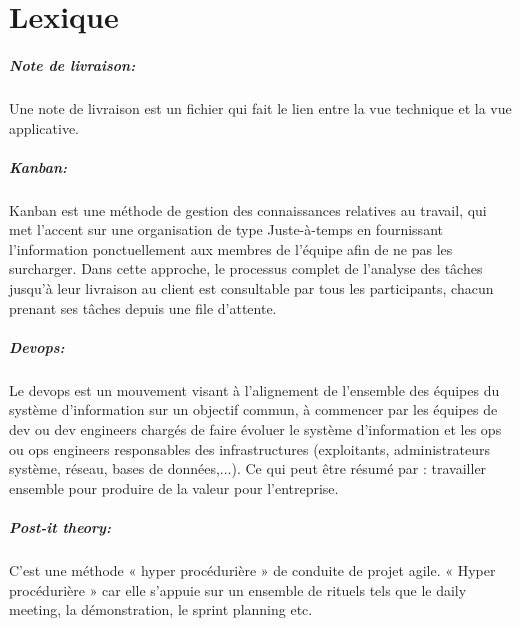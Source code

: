 \chapter*{Lexique}
\label{chap:Lexique}

\paragraph{Note de livraison: }
\label{lexi:delivery_note}
Une note de livraison est un fichier qui fait le lien entre la vue technique et la vue applicative.

\paragraph{Kanban: }
\label{lexi:kanban}
Kanban est une méthode de gestion des connaissances relatives au travail, qui met l’accent sur une organisation de type Juste-à-temps en fournissant l'information ponctuellement aux membres de l'équipe afin de ne pas les surcharger. Dans cette approche, le processus complet de l'analyse des tâches jusqu’à leur livraison au client est consultable par tous les participants, chacun prenant ses tâches depuis une file d'attente.

\paragraph{Devops: }
\label{lexi:devops}
Le devops est un mouvement visant à l'alignement de l'ensemble des équipes du système d'information sur un objectif commun, à commencer par les équipes de dev ou dev engineers chargés de faire évoluer le système d'information et les ops ou ops engineers responsables des infrastructures (exploitants, administrateurs système, réseau, bases de données,...). Ce qui peut être résumé par : travailler ensemble pour produire de la valeur pour l'entreprise.

\paragraph{Post-it theory: }
\label{lexi:post_it_theory}
C’est une méthode « hyper procédurière » de conduite de projet agile.
« Hyper procédurière » car elle s’appuie sur un ensemble de rituels tels que le daily meeting, la démonstration, le sprint planning etc.
